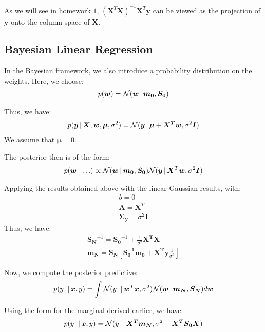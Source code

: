 \documentclass{article}
\renewcommand{\v}{\boldsymbol}
\begin{document}
		As we will see in homework $1$, $(\v{X}^T \v{X})^{-1} \v{X}^T \v{y}$ can be viewed as the projection of $\v{y}$ onto the column space of $\v{X}$.

\subsection{Bayesian Linear Regression}
In the Bayesian framework, we also introduce a probability distribution on the weights. Here, we choose:
	\begin{align*}
		p(\v{w}) = \mathcal{N}(\v{w} \given \v{m_0}, \v{S_0}) 
	\end{align*}
	
	Thus, we have:
	\begin{align*}
		p(\v{y} \given \v{X}, \v{w}, \v{\mu}, \sigma^2) = \mathcal{N}(\v{y} \given \v{\mu} + \v{X^T} \v{w}, \sigma^2 \v{I})
	\end{align*}
	We assume that $\v{\mu} = 0$.
	
The posterior then is of the form:
\begin{align*}
	p(\v{w} \given \ldots) \propto \mathcal{N}(\v{w} \given \v{m_0}, \v{S_0}) \mathcal{N}(\v{y} \given  \v{X}^T \v{w}, \sigma^2 \v{I})
\end{align*}

Applying the results obtained above with the linear Gaussian results, with:
	\begin{align*}
		b = 0 \\
		\v{A} = \v{X}^T \\
		\v{\Sigma_y} = \sigma^2 \v{I}
	\end{align*}
	Thus, we have:
	\begin{align*}
		\v{S_N}^{-1} = \v{S_0}^{-1} + \frac{1}{\sigma^2}\v{X^T} \v{X} \\
		\v{m_N} = \v{S_N} \left [\v{S_0^{-1}} \v{m_0} + \v{X^T} \v{y} \frac{1}{\sigma^2} \right]
	\end{align*}
	
	Now, we compute the posterior predictive:
	\begin{align*}
		p(y^{~} \given \v{x}, y) = \int \mathcal{N}(y^{~}\given \v{w}^T \v{x}, \sigma^2) \mathcal{N}(\v{w} \given \v{m_N}, \v{S_N}) d\v{w}
	\end{align*}
	
	Using the form for the marginal derived earlier, we have:
	\begin{align*}
		p(y^{~} \given \v{x}, y) = \mathcal{N} (y^{~} \given \v{X^T} \v{m_N}, \sigma^2 + \v{X^T} \v{S_0} \v{X})
	\end{align*}
	
\end{document}
